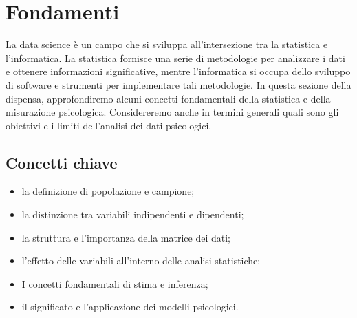 \documentclass[
  letterpaper,
]{krantz}
\providecommand{\tightlist}{%
  \setlength{\itemsep}{0pt}\setlength{\parskip}{0pt}}\usepackage{longtable,booktabs,array}
\begin{document}
\part{Fondamenti}

La data science è un campo che si sviluppa all'intersezione tra la
statistica e l'informatica. La statistica fornisce una serie di
metodologie per analizzare i dati e ottenere informazioni significative,
mentre l'informatica si occupa dello sviluppo di software e strumenti
per implementare tali metodologie. In questa sezione della dispensa,
approfondiremo alcuni concetti fondamentali della statistica e della
misurazione psicologica. Considereremo anche in termini generali quali
sono gli obiettivi e i limiti dell'analisi dei dati psicologici.

\chapter{Concetti chiave}\label{sec-key-notions}

\begin{tcolorbox}[enhanced jigsaw, toprule=.15mm, breakable, bottomrule=.15mm, colback=white, colbacktitle=quarto-callout-important-color!10!white, left=2mm, toptitle=1mm, colframe=quarto-callout-important-color-frame, coltitle=black, opacitybacktitle=0.6, bottomtitle=1mm, titlerule=0mm, leftrule=.75mm, opacityback=0, rightrule=.15mm, title=\textcolor{quarto-callout-important-color}{\faExclamation}\hspace{0.5em}{In questo capitolo apprenderai:}, arc=.35mm]

\begin{itemize}
\tightlist
\item
  la definizione di popolazione e campione;
\item
  la distinzione tra variabili indipendenti e dipendenti;
\item
  la struttura e l'importanza della matrice dei dati;
\item
  l'effetto delle variabili all'interno delle analisi statistiche;
\item
  I concetti fondamentali di stima e inferenza;
\item
  il significato e l'applicazione dei modelli psicologici.\\
\end{itemize}

\end{tcolorbox}
\end{document}
